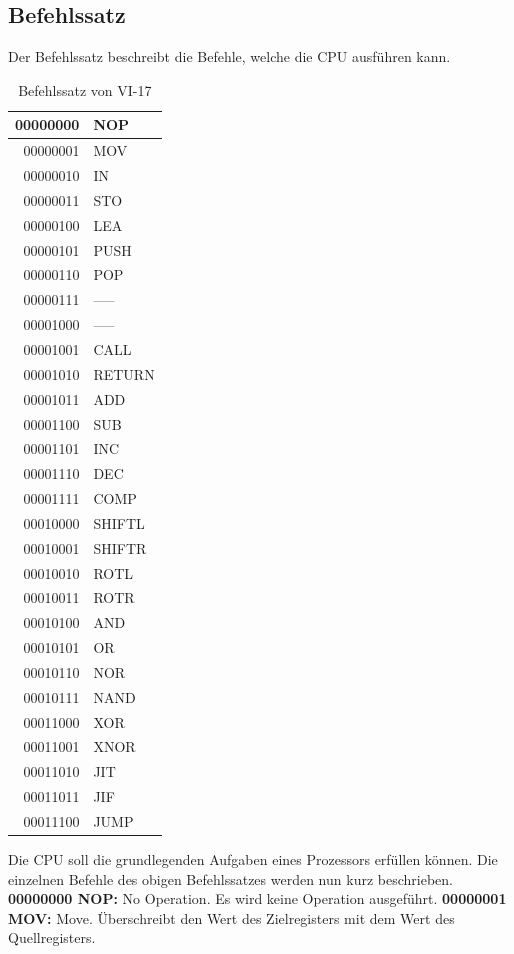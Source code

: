 \documentclass[12pt]{article}
\begin{document}
\subsection{Befehlssatz}

Der Befehlssatz beschreibt die Befehle, welche die CPU ausführen kann.
\newpage
\begin{table}[!htb]
\centering
\caption{Befehlssatz von VI-17}
\begin{tabular}{|r|l|}
  \hline
  00000000 & NOP \\
  \hline
  00000001 & MOV\\ 
  \hline
  00000010 & IN\\
  \hline
  00000011 & STO\\
  \hline
  00000100 & LEA\\
  \hline
  00000101 & PUSH \\ 
  \hline
  00000110 & POP\\
  \hline
  00000111 & -----\\
 \hline
  00001000 & ----- \\
  \hline
  00001001 & CALL\\ 
  \hline
  00001010 & RETURN\\
  \hline
  00001011 & ADD\\
  \hline 
 00001100 & SUB \\
  \hline
  00001101 & INC\\ 
  \hline
  00001110 & DEC\\
  \hline
  00001111 & COMP\\
  \hline
  00010000 & SHIFTL\\
  \hline
  00010001 & SHIFTR\\ 
  \hline
  00010010 & ROTL\\
  \hline
  00010011 & ROTR\\
  \hline
  00010100 & AND\\
  \hline
  00010101 & OR \\ 
  \hline
  00010110 & NOR\\
  \hline
  00010111 & NAND\\
  \hline
  00011000 & XOR\\
  \hline
  00011001 & XNOR \\
  \hline
  00011010 & JIT\\
  \hline
  00011011 & JIF\\
  \hline
  00011100 & JUMP\\
  \hline
\end{tabular}
\end{table}
\newpage
Die CPU soll die grundlegenden Aufgaben eines Prozessors erfüllen können. Die einzelnen Befehle des obigen Befehlssatzes werden nun kurz beschrieben.
\newline
\indent 
\textbf{00000000 NOP: }No Operation. Es wird keine Operation ausgeführt.
\newline
\indent 
\textbf{00000001 MOV: } Move. Überschreibt den Wert des Zielregisters mit dem Wert des Quellregisters. 
\end{document}
